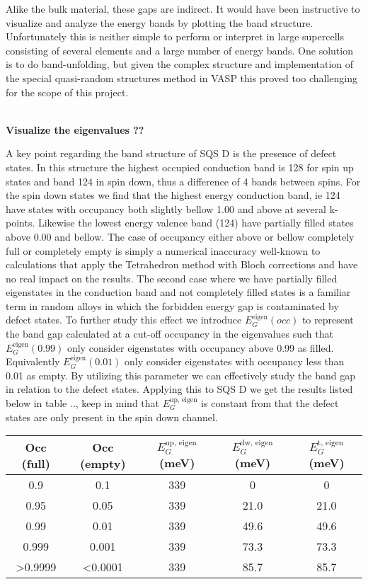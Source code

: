 Alike the bulk material, these gaps are indirect. It would have been instructive to visualize and analyze the energy bands by plotting the band structure. Unfortunately this is neither simple to perform or interpret in large supercells consisting of several elements and a large number of energy bands. One solution is to do band-unfolding, but given the complex structure and implementation of the special quasi-random structures method in VASP this proved too challenging for the scope of this project. 

 
\textbf{ \\ Visualize the eigenvalues ??}

A key point regarding the band structure of SQS D is the presence of defect states. In this structure the highest occupied conduction band is 128 for spin up states and band 124 in spin down, thus a difference of 4 bands between spins. For the spin down states we find that the highest energy conduction band, ie 124 have states with occupancy both slightly bellow 1.00 and above at several k-points. Likewise the lowest energy valence band (124) have partially filled states above 0.00 and bellow. The case of occupancy either above or bellow completely full or completely empty is simply a numerical inaccuracy well-known to calculations that apply the Tetrahedron method with Bloch corrections and have no real impact on the results. The second case where we have partially filled eigenstates in the conduction band and not completely filled states is a familiar term in random alloys \cite{PhysRevLett.104.236403} in which the forbidden energy gap is contaminated by defect states. To further study this effect we introduce $E_G ^\text{eigen}(occ)$ to represent the band gap calculated at a cut-off occupancy in the eigenvalues such that $E_G ^\text{eigen}(0.99)$ only consider eigenstates with occupancy above 0.99 as filled. Equivalently $E_G ^\text{eigen}(0.01)$ only consider eigenstates with occupancy less than 0.01 as empty. By utilizing this parameter we can effectively study the band gap in relation to the defect states. Applying this to SQS D we get the results listed below in table .., keep in mind that $E_G ^\text{up, eigen}$ is constant from that the defect states are only present in the spin down channel.

\begin{table}[H]
\centering
\begin{tabular}{@{}ccccc@{}}
\toprule
Occ (full)          & Occ (empty)      & $E_G ^\text{up, eigen}$ (meV)  & $E_G ^\text{dw, eigen}$ (meV) & $E_G ^\text{t, eigen}$ (meV) \\ \midrule
0.9                 & 0.1              & 339 & 0    & 0     \\
0.95                & 0.05             & 339 & 21.0 & 21.0  \\
0.99                & 0.01             & 339 & 49.6 & 49.6  \\
0.999               & 0.001            & 339 & 73.3 & 73.3  \\
\textgreater 0.9999 & \textless 0.0001 & 339 & 85.7 & 85.7  \\ \bottomrule
\end{tabular}
\end{table}


